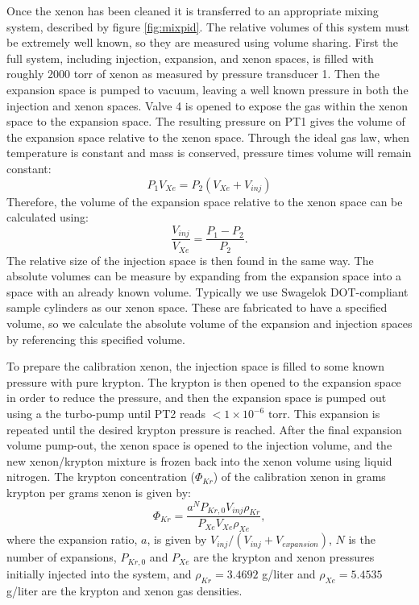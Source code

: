 Once the xenon has been cleaned it is transferred to an appropriate mixing system, described by figure \ref{fig:mixpid}. The relative volumes of this system must be extremely well known, so they are measured using volume sharing. First the full system, including injection, expansion, and xenon spaces, is filled with roughly 2000 torr of xenon as measured by pressure transducer 1. Then the expansion space is pumped to vacuum, leaving a well known pressure in both the injection and xenon spaces. Valve 4 is opened to expose the gas within the xenon space to the expansion space. The resulting pressure on PT1 gives the volume of the expansion space relative to the xenon space. Through the ideal gas law, when temperature is constant and mass is conserved, pressure times volume will remain constant:
\begin{equation}
P_{1}V_{Xe} = P_{2}(V_{Xe}+V_{inj})
\end{equation}
Therefore, the volume of the expansion space relative to the xenon space can be calculated using:
\begin{equation}
\frac{V_{inj}}{V_{Xe}} = \frac{P_{1}-P_{2}}{P_{2}}.
\end{equation}
The relative size of the injection space is then found in the same way. The absolute volumes can be measure by expanding from the expansion space into a space with an already known volume. Typically we use Swagelok DOT-compliant sample cylinders as our xenon space. These are fabricated to have a specified volume, so we calculate the absolute volume of the expansion and injection spaces by referencing this specified volume.

To prepare the calibration xenon, the injection space is filled to some known pressure with pure krypton. The krypton is then opened to the expansion space in order to reduce the pressure, and then the expansion space is pumped out using a the turbo-pump until PT2 reads $<1\times10^{-6} \textrm{ torr}$. This expansion is repeated until the desired krypton pressure is reached. After the final expansion volume pump-out, the xenon space is opened to the injection volume, and the new xenon/krypton mixture is frozen back into the xenon volume using liquid nitrogen. The krypton concentration ($\Phi_{Kr}$) of the calibration xenon in grams krypton per grams xenon is given by:
\begin{equation}
\Phi_{Kr} = \frac{a^{N}P_{Kr,0}V_{inj}\rho_{Kr} }{P_{Xe}V_{Xe}\rho_{Xe}},
\end{equation}
where the expansion ratio, $a$, is given by $V_{inj}/(V_{inj}+V_{expansion})$, $N$ is the number of expansions, $P_{Kr,0}$ and $P_{Xe}$ are the krypton and xenon pressures initially injected into the system, and $\rho_{Kr}=3.4692$ g/liter and $\rho_{Xe}=5.4535$ g/liter are the krypton and xenon gas densities.\cite{nist} 

